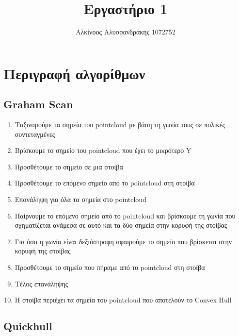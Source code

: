 \documentclass{article}
\title{Εργαστήριο 1}
\author{Αλκίνοος Αλυσσανδράκης 1072752}
\date{}
\begin{document}
\maketitle

\section{Περιγραφή αλγορίθμων}

\subsection{Graham Scan}

\begin{enumerate}
	\item Ταξινομούμε τα σημεία του pointcloud με βάση τη γωνία τους σε πολικές
		συντεταγμένες
	\item Βρίσκουμε το σημείο του pointcloud που έχει το μικρότερο Y
	\item Προσθέτουμε το σημείο σε μια στοίβα
	\item Προσθέτουμε το επόμενο σημείο από το pointcloud στη στοίβα
	\item Επανάληψη για όλα τα σημεία στο pointcloud
	\item Παίρνουμε το επόμενο σημείο από το pointcloud και βρίσκουμε τη γωνία που σχηματίζεται ανάμεσα σε αυτό και τα δύο σημεία στην κορυφή της στοίβας
	\item Για όσο η γωνία είναι δεξιόστροφη αφαιρούμε το σημείο που βρίσκεται στην κορυφή της στοίβας
	\item Προσθέτουμε το σημείο που πήραμε από το pointcloud στη στοίβα
	\item Τέλος επανάληψης
	\item Η στοίβα περιέχει τα σημεία του pointcloud που αποτελούν το Convex Hull
\end{enumerate}

\subsection{Quickhull}
\end{document}
